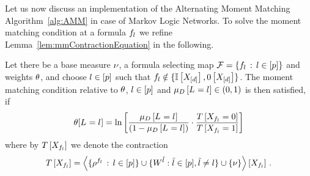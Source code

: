 

Let us now discuss an implementation of the Alternating Moment Matching Algorithm~\ref{alg:AMM} in case of Markov Logic Networks.
To solve the moment matching condition at a formula $f_{l}$ we refine Lemma~\ref{lem:mmContractionEquation} in the following.


\begin{lemma}\label{ref:lemMMinMLN}
	Let there be a base measure $\nu$, a formula selecting map $\mathcal{F}=\{f_{l} \, : \, l\in[p]\}$ and weights $\theta$, and choose $l\in[p]$ such that $f_{l}  \notin \{\mathbb{I}\left[X_{[d]}\right],0\left[X_{[d]}\right]\}$.	
	The moment matching condition relative to $\theta$, $l\in[p]$ and $\mu_{D}\left[L_{}=l_{}\right]\in(0,1)$ is then satisfied, if
	\begin{align*}
	 	\theta[L_{}=l_{}] = \ln \left[ 
		\frac{\mu_{D}\left[L_{}=l_{}\right]}{(1-\mu_{D}\left[L_{}=l_{}\right])} 
		\cdot \frac{T\left[X_{f_{l} }=0\right]}{T\left[X_{f_{l} }=1\right]} 
		 \right] 
	\end{align*}
	where by $T\left[X_{f_{l} }\right]$ we denote the contraction 
	\begin{align*}
	 	T\left[X_{f_{l}}\right] 
		= \left\langle \{\rho^{f_{l}} \, : \, l\in[p]\}
		\cup\{W^{\tilde{l}} : \tilde{l} \in [p], \tilde{l}\neq l\}
		\cup\{\nu\}\right\rangle \left[ X_{f_{l}} \right] \, . 
	\end{align*}
\end{lemma}
